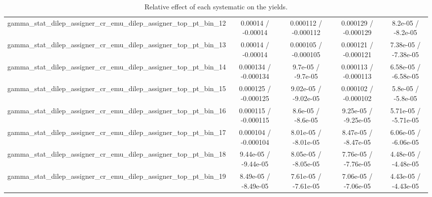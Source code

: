 \documentclass[10pt]{article}
\begin{document}
\begin{table}[htbp]
\begin{center}
\begin{tabular}{|c|c|c|c|c|}
  gamma_stat_dilep_assigner_cr_emu_dilep_assigner_top_pt_bin_12 & 0.00014 / -0.00014 & 0.000112 / -0.000112 & 0.000129 / -0.000129 & 8.2e-05 / -8.2e-05 \\ 
  gamma_stat_dilep_assigner_cr_emu_dilep_assigner_top_pt_bin_13 & 0.00014 / -0.00014 & 0.000105 / -0.000105 & 0.000121 / -0.000121 & 7.38e-05 / -7.38e-05 \\ 
  gamma_stat_dilep_assigner_cr_emu_dilep_assigner_top_pt_bin_14 & 0.000134 / -0.000134 & 9.7e-05 / -9.7e-05 & 0.000113 / -0.000113 & 6.58e-05 / -6.58e-05 \\ 
  gamma_stat_dilep_assigner_cr_emu_dilep_assigner_top_pt_bin_15 & 0.000125 / -0.000125 & 9.02e-05 / -9.02e-05 & 0.000102 / -0.000102 & 5.8e-05 / -5.8e-05 \\ 
  gamma_stat_dilep_assigner_cr_emu_dilep_assigner_top_pt_bin_16 & 0.000115 / -0.000115 & 8.6e-05 / -8.6e-05 & 9.25e-05 / -9.25e-05 & 5.71e-05 / -5.71e-05 \\ 
  gamma_stat_dilep_assigner_cr_emu_dilep_assigner_top_pt_bin_17 & 0.000104 / -0.000104 & 8.01e-05 / -8.01e-05 & 8.47e-05 / -8.47e-05 & 6.06e-05 / -6.06e-05 \\ 
  gamma_stat_dilep_assigner_cr_emu_dilep_assigner_top_pt_bin_18 & 9.44e-05 / -9.44e-05 & 8.05e-05 / -8.05e-05 & 7.76e-05 / -7.76e-05 & 4.48e-05 / -4.48e-05 \\ 
  gamma_stat_dilep_assigner_cr_emu_dilep_assigner_top_pt_bin_19 & 8.49e-05 / -8.49e-05 & 7.61e-05 / -7.61e-05 & 7.06e-05 / -7.06e-05 & 4.43e-05 / -4.43e-05 \\ 
\hline 
\end{tabular} 
\caption{Relative effect of each systematic on the yields.} 
\end{center} 
\end{table} 
\end{document}
